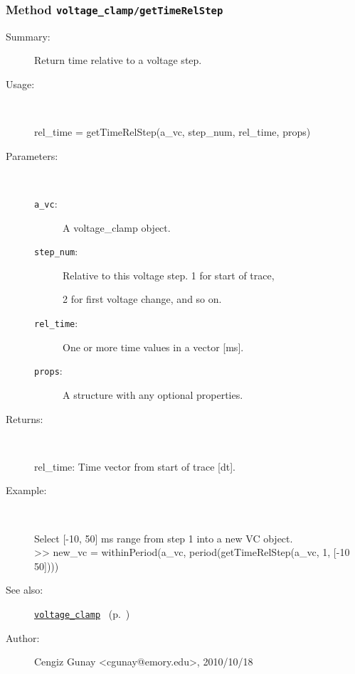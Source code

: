 \subsubsection[Method \texttt{getTimeRelStep}]{Method \texttt{voltage\_clamp/getTimeRelStep}}%
%
\label{ref_voltage_clamp__getTimeRelStep}%
\hypertarget{ref_voltage_clamp__getTimeRelStep}{}%
\begin{description}
\item[Summary:]Return time relative to a voltage step.
%
\item[Usage:]~%
\begin{lyxcode}%
rel\_time = getTimeRelStep(a\_vc, step\_num, rel\_time, props)
%
\end{lyxcode}%
%
%
\item[Parameters:]~
\begin{description}%
\item[\texttt{a\_vc}:]
 A voltage\_clamp object.
\item[\texttt{step\_num}:]
 Relative to this voltage step. 1 for start of trace,

2 for first voltage change, and so on.
\item[\texttt{rel\_time}:]
 One or more time values in a vector [ms].
\item[\texttt{props}:]
 A structure with any optional properties.
\end{description}%
%
\item[Returns:
]~

   rel\_time: Time vector from start of trace [dt].
%
\item[Example:]~
\begin{lyxcode} Select [-10, 50] ms range from step 1 into a new VC object.
\\%
 >> new\_vc = withinPeriod(a\_vc, period(getTimeRelStep(a\_vc, 1, [-10 50])))
\\%
\end{lyxcode}
%
\item[See also:]%
\hyperlink{ref_voltage_clamp}{\texttt{voltage\_clamp}}%
\ (p.~\pageref{ref_voltage_clamp})%
%
%
\item[Author:]%
Cengiz Gunay <cgunay@emory.edu>, 2010/10/18
%
\end{description}
\methodline%
